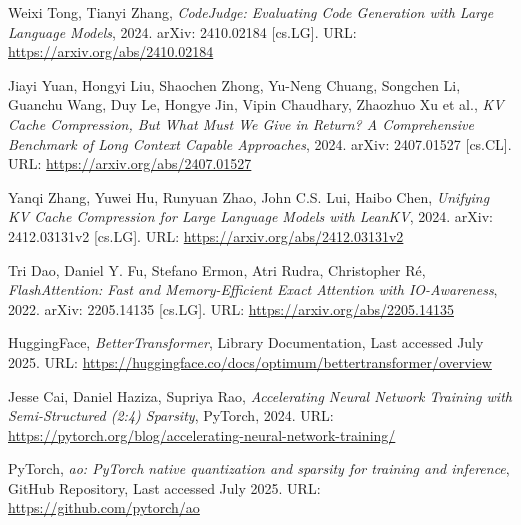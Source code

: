 \begin{thebibliography}{9}
	Weixi Tong, Tianyi Zhang,
	\textit{CodeJudge: Evaluating Code Generation with Large Language Models},
	2024. arXiv: 2410.02184 [cs.LG]. URL: \url{https://arxiv.org/abs/2410.02184}

	Jiayi Yuan, Hongyi Liu, Shaochen Zhong, Yu-Neng Chuang, Songchen Li, Guanchu Wang, Duy Le, Hongye Jin, Vipin Chaudhary, Zhaozhuo Xu et al.,
	\textit{KV Cache Compression, But What Must We Give in Return? A Comprehensive Benchmark of Long Context Capable Approaches},
	2024. arXiv: 2407.01527 [cs.CL]. URL: \url{https://arxiv.org/abs/2407.01527}

	Yanqi Zhang, Yuwei Hu, Runyuan Zhao, John C.S. Lui, Haibo Chen,
	\textit{Unifying KV Cache Compression for Large Language Models with LeanKV},
	2024. arXiv: 2412.03131v2 [cs.LG]. URL: \url{https://arxiv.org/abs/2412.03131v2}

	Tri Dao, Daniel Y. Fu, Stefano Ermon, Atri Rudra, Christopher Ré,
	\textit{FlashAttention: Fast and Memory-Efficient Exact Attention with IO-Awareness},
	2022. arXiv: 2205.14135 [cs.LG]. URL: \url{https://arxiv.org/abs/2205.14135}

	HuggingFace,
	\textit{BetterTransformer},
	Library Documentation, Last accessed July 2025. URL: \url{https://huggingface.co/docs/optimum/bettertransformer/overview}

	Jesse Cai, Daniel Haziza, Supriya Rao,
	\textit{Accelerating Neural Network Training with Semi-Structured (2:4) Sparsity},
	PyTorch, 2024. URL: \url{https://pytorch.org/blog/accelerating-neural-network-training/}

	PyTorch,
	\textit{ao: PyTorch native quantization and sparsity for training and inference},
	GitHub Repository, Last accessed July 2025. URL: \url{https://github.com/pytorch/ao}

\end{thebibliography}